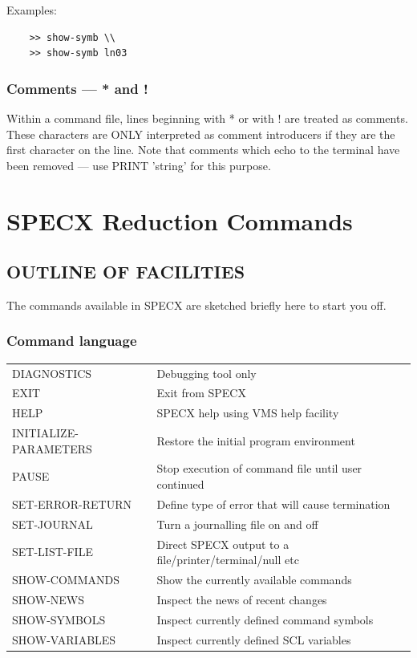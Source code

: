 \documentclass[11pt,twoside]{report}
\begin{document}
Examples:
\begin{verbatim}
    >> show-symb \\
    >> show-symb ln03
\end{verbatim}

\subsection{Comments --- * and !}\index{*}

Within a command file, lines beginning with * or with ! are treated as
comments. These characters are ONLY interpreted as comment introducers if they
are the first character on the line. Note that comments which echo to the
terminal have been removed --- use PRINT 'string' for this purpose.

\chapter{SPECX Reduction Commands}
\section{OUTLINE OF FACILITIES}

The commands available in SPECX are sketched briefly here to start you off.

\subsection{Command language}

\begin{tabular}{ll}
DIAGNOSTICS            & Debugging tool only\\
EXIT                   & Exit from SPECX\\
HELP                   & SPECX help using VMS help facility\\
INITIALIZE-PARAMETERS  & Restore the initial program environment\\
PAUSE                  & Stop execution of command file until user continued\\
SET-ERROR-RETURN       & Define type of error that will cause termination\\
SET-JOURNAL            & Turn a journalling file on and off\\
SET-LIST-FILE          & Direct SPECX output to a file/printer/terminal/null etc\\
SHOW-COMMANDS          & Show the currently available commands\\
SHOW-NEWS              & Inspect the news of recent changes\\
SHOW-SYMBOLS           & Inspect currently defined command symbols\\
SHOW-VARIABLES         & Inspect currently defined SCL variables\\
\end{tabular}
\end{document}
